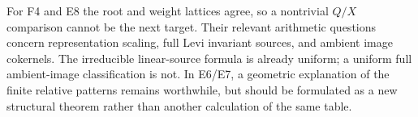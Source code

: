 For F4 and E8 the root and weight lattices agree, so a nontrivial $Q/X$ comparison cannot be the next target. Their relevant arithmetic questions concern representation scaling, full Levi invariant sources, and ambient image cokernels. The irreducible linear-source formula is already uniform; a uniform full ambient-image classification is not. In E6/E7, a geometric explanation of the finite relative patterns remains worthwhile, but should be formulated as a new structural theorem rather than another calculation of the same table.


